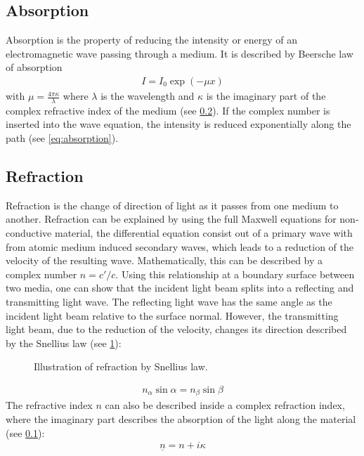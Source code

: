 \subsection{Absorption}\label{sec:theoAbsorption}
%
Absorption is the property of reducing the intensity or energy of an electromagnetic wave passing through a medium.
It is described by Beersche law of absorption
% 
\begin{align} 
    I = I_0 \exp(-\mu x) \label{eq:absorption}
\end{align}
%
with $\mu = \frac{4\pi \kappa}{\lambda}$ where $\lambda$ is the wavelength and $\kappa$ is the imaginary part of the complex refractive index of the medium (see \cref{sec:theoRefraction}).
If the complex number is inserted into the wave equation, the intensity is reduced exponentially along the path (see \cref{eq:absorption}).
%
% 
% 
\subsection{Refraction}\label{sec:theoRefraction}
%
Refraction is the change of direction of light as it passes from one medium to another.
Refraction can be explained by using the full Maxwell equations for non-conductive material, 
\ie{} the differential equation consist out of a primary wave with from atomic medium induced secondary waves, which leads to a reduction of the velocity of the resulting wave.
Mathematically, this can be described by a complex number $n = c' / c$.
Using this relationship at a boundary surface between two media, one can show that the incident light beam splits into a reflecting and transmitting light wave.
The reflecting light wave has the same angle as the incident light beam relative to the surface normal.
% 
However, the transmitting light beam, due to the reduction of the velocity, changes its direction described by the Snellius law (see \cref{fig:optic_refraction}):
%
\begin{figure}[!t]
\centering
\setlength{\tikzwidth}{\textwidth}
\caption{Illustration of refraction by Snellius law.}
\label{fig:optic_refraction}
\end{figure}
% 
\begin{align}
    n_\alpha \sin \alpha = n_\beta \sin \beta \label{eq:Snellius}
\end{align}
% 
The refractive index $n$ can also be described inside a complex refraction index, where the imaginary part describes the absorption of the light along the material (see \cref{sec:theoAbsorption}):
% 
\begin{align}
\underline{n} = n + i\kappa
\end{align}
% 
%
%
